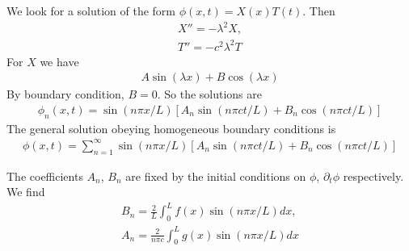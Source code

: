 \documentclass[a4paper]{article}
\begin{document}
\begin{eg}
We look for a solution of the form $\phi\left(x,t\right) = X\left(x\right)T\left(t\right)$. Then
\begin{equation*}
\begin{aligned}
X'' = -\lambda^2 X,\\
T'' = -c^2 \lambda^2 T
\end{aligned}
\end{equation*}
For $X$ we have
\begin{equation*}
\begin{aligned}
A\sin\left(\lambda x\right) + B\cos\left(\lambda x\right)
\end{aligned}
\end{equation*}
By boundary condition, $B=0$. So the solutions are
\begin{equation*}
\begin{aligned}
\phi_n\left(x,t\right) = \sin\left(n\pi x/L\right) \left[A_n \sin\left(n\pi ct/L\right) + B_n \cos\left(n\pi ct/L\right)\right]
\end{aligned}
\end{equation*}
The general solution obeying homogeneous boundary conditions is
\begin{equation*}
\begin{aligned}
\phi\left(x,t\right) = \sum_{n=1}^\infty \sin\left(n\pi x/L\right) \left[A_n \sin\left(n\pi ct/L\right) + B_n \cos\left(n\pi ct/L\right)\right]
\end{aligned}
\end{equation*}

The coefficients $A_n$, $B_n$ are fixed by the initial conditions on $\phi$, $\partial_t \phi$ respectively. We find
\begin{equation*}
\begin{aligned}
B_n = \frac{2}{L} \int_0^L f\left(x\right) \sin\left(n\pi x/L\right) dx,\\
A_n = \frac{2}{n\pi c}\int_0^L g\left(x\right) \sin\left(n\pi x/L\right) dx
\end{aligned}
\end{equation*}
\end{eg}
\end{document}

